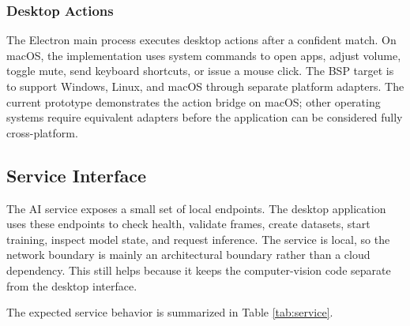 \documentclass[10pt,twocolumn]{article}
\begin{document}
\subsubsection{Desktop Actions}
The Electron main process executes desktop actions after a confident match.
On macOS, the implementation uses system commands to open apps, adjust volume, toggle mute, send keyboard shortcuts, or issue a mouse click.
The BSP target is to support Windows, Linux, and macOS through separate platform adapters.
The current prototype demonstrates the action bridge on macOS; other operating systems require equivalent adapters before the application can be considered fully cross-platform.

\subsection{Service Interface}
The AI service exposes a small set of local endpoints.
The desktop application uses these endpoints to check health, validate frames, create datasets, start training, inspect model state, and request inference.
The service is local, so the network boundary is mainly an architectural boundary rather than a cloud dependency.
This still helps because it keeps the computer-vision code separate from the desktop interface.

The expected service behavior is summarized in Table \ref{tab:service}.

\begin{table}[H]
  \caption{Main local AI service responsibilities}
  \label{tab:service}
  \centering
\end{table}
\FloatBarrier
\end{document}
